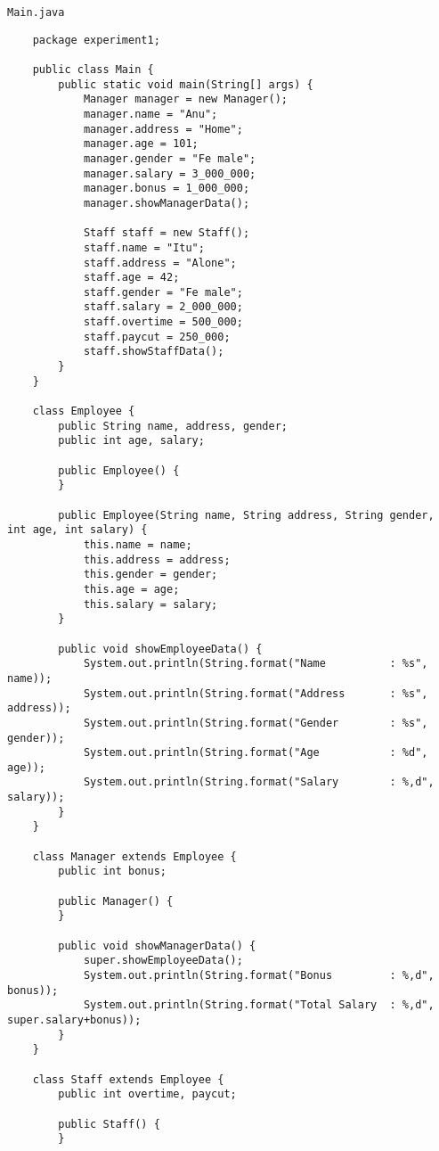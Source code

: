 \documentclass[12pt,titlepage]{article}
\begin{document}
\texttt{Main.java}
\begin{verbatim}
    package experiment1;

    public class Main {
        public static void main(String[] args) {
            Manager manager = new Manager();
            manager.name = "Anu";
            manager.address = "Home";
            manager.age = 101;
            manager.gender = "Fe male";
            manager.salary = 3_000_000;
            manager.bonus = 1_000_000;
            manager.showManagerData();
            
            Staff staff = new Staff();
            staff.name = "Itu";
            staff.address = "Alone";
            staff.age = 42;
            staff.gender = "Fe male";
            staff.salary = 2_000_000;
            staff.overtime = 500_000;
            staff.paycut = 250_000;
            staff.showStaffData();
        }
    }

    class Employee {
        public String name, address, gender;
        public int age, salary;

        public Employee() {
        }

        public Employee(String name, String address, String gender, int age, int salary) {
            this.name = name;
            this.address = address;
            this.gender = gender;
            this.age = age;
            this.salary = salary;
        }

        public void showEmployeeData() {
            System.out.println(String.format("Name          : %s", name));
            System.out.println(String.format("Address       : %s", address));
            System.out.println(String.format("Gender        : %s", gender));
            System.out.println(String.format("Age           : %d", age));
            System.out.println(String.format("Salary        : %,d", salary));
        }
    }

    class Manager extends Employee {
        public int bonus;

        public Manager() {
        }

        public void showManagerData() {
            super.showEmployeeData();
            System.out.println(String.format("Bonus         : %,d", bonus));
            System.out.println(String.format("Total Salary  : %,d", super.salary+bonus));
        }
    }

    class Staff extends Employee {
        public int overtime, paycut;
        
        public Staff() {
        }
        

\end{verbatim}
\end{document}
